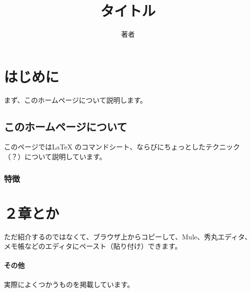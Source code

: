 \documentclass[a4paper,10.5pt,oneside,openany]{jsbook}
\title{タイトル}
\author{著者}
\begin{document}

\maketitle

\tableofcontents


\chapter{はじめに}

まず、このホームページについて説明します。

\section{このホームページについて}

このページではLaTeX のコマンドシート、ならびにちょっとしたテクニック（？）について説明しています。

\subsection{特徴}

\chapter{２章とか}

ただ紹介するのではなくて、ブラウザ上からコピーして、Mule、秀丸エディタ、メモ帳などのエディタにペースト（貼り付け）できます。

\subsubsection{その他}

実際によくつかうものを掲載しています。

\newpage
%
%
\end{document}
